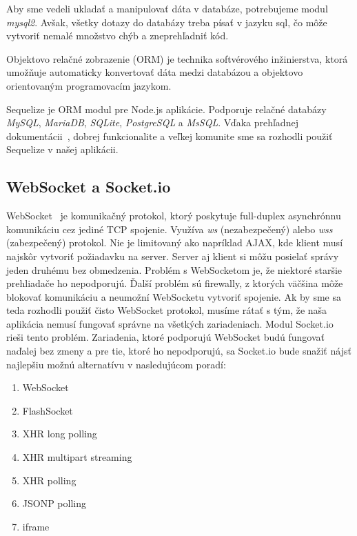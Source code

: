Aby sme vedeli ukladať a manipulovať dáta v databáze, potrebujeme modul \textit{mysql2}.
Avšak, všetky dotazy do databázy treba písať v jazyku sql, čo môže vytvoriť nemalé
množstvo chýb a zneprehľadniť kód.

Objektovo relačné zobrazenie (ORM) je technika
softvérového inžinierstva, ktorá umožňuje automaticky
konvertovať dáta medzi databázou a objektovo orientovaným programovacím jazykom.
~\cite{bib:orm}

Sequelize je ORM modul pre Node.js aplikácie. Podporuje relačné databázy \textit{MySQL},
\textit{MariaDB}, \textit{SQLite}, \textit{PostgreSQL} a \textit{MsSQL}.
Vďaka prehľadnej dokumentácii~\cite{bib:sequelizedocs}, dobrej funkcionalite a veľkej
komunite sme sa rozhodli použiť Sequelize v našej aplikácii.

\subsection{WebSocket a Socket.io}
\label{sec:nodejs:socketio}

WebSocket~\cite{bib:fette2011websocket} je komunikačný protokol, ktorý poskytuje full-duplex asynchrónnu komunikáciu cez
jediné TCP spojenie. Využíva \textit{ws} (nezabezpečený) alebo \textit{wss} (zabezpečený)
protokol. Nie je limitovaný ako napríklad AJAX, kde klient musí najskôr vytvoriť
požiadavku na server. Server aj klient si môžu posielať správy jeden druhému bez
obmedzenia. Problém s WebSocketom je, že niektoré staršie prehliadače ho nepodporujú.
Ďalší problém sú firewally, z ktorých väčšina môže blokovať komunikáciu a neumožní
WebSocketu vytvoriť spojenie. Ak by sme sa teda rozhodli použiť čisto WebSocket
protokol, musíme rátať s tým, že naša aplikácia nemusí fungovať správne na všetkých
zariadeniach. Modul Socket.io rieši tento problém. Zariadenia, ktoré
podporujú WebSocket budú fungovať naďalej bez zmeny a pre tie, ktoré ho
nepodporujú, sa Socket.io bude snažiť nájsť najlepšiu možnú alternatívu v
nasledujúcom poradí:
\begin{enumerate}
	\item WebSocket
	\item FlashSocket
	\item XHR long polling
	\item XHR multipart streaming
	\item XHR polling
	\item JSONP polling
	\item iframe
\end{enumerate}

